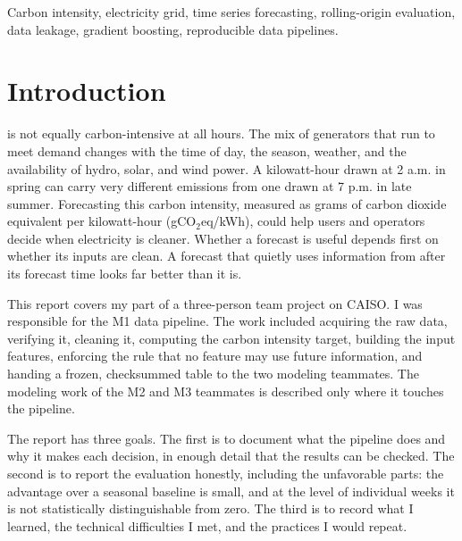 \documentclass[10pt,journal,compsoc]{IEEEtran}
\begin{document}
\begin{IEEEkeywords}
Carbon intensity, electricity grid, time series forecasting, rolling-origin evaluation, data leakage, gradient boosting, reproducible data pipelines.
\end{IEEEkeywords}

\section{Introduction}
 is not equally carbon-intensive at all hours. The mix of generators that run to meet demand changes with the time of day, the season, weather, and the availability of hydro, solar, and wind power. A kilowatt-hour drawn at 2 a.m. in spring can carry very different emissions from one drawn at 7 p.m. in late summer. Forecasting this carbon intensity, measured as grams of carbon dioxide equivalent per kilowatt-hour (gCO$_2$eq/kWh), could help users and operators decide when electricity is cleaner. Whether a forecast is useful depends first on whether its inputs are clean. A forecast that quietly uses information from after its forecast time looks far better than it is.

This report covers my part of a three-person team project on CAISO. I was responsible for the M1 data pipeline. The work included acquiring the raw data, verifying it, cleaning it, computing the carbon intensity target, building the input features, enforcing the rule that no feature may use future information, and handing a frozen, checksummed table to the two modeling teammates. The modeling work of the M2 and M3 teammates is described only where it touches the pipeline.

The report has three goals. The first is to document what the pipeline does and why it makes each decision, in enough detail that the results can be checked. The second is to report the evaluation honestly, including the unfavorable parts: the advantage over a seasonal baseline is small, and at the level of individual weeks it is not statistically distinguishable from zero. The third is to record what I learned, the technical difficulties I met, and the practices I would repeat.
\end{document}

